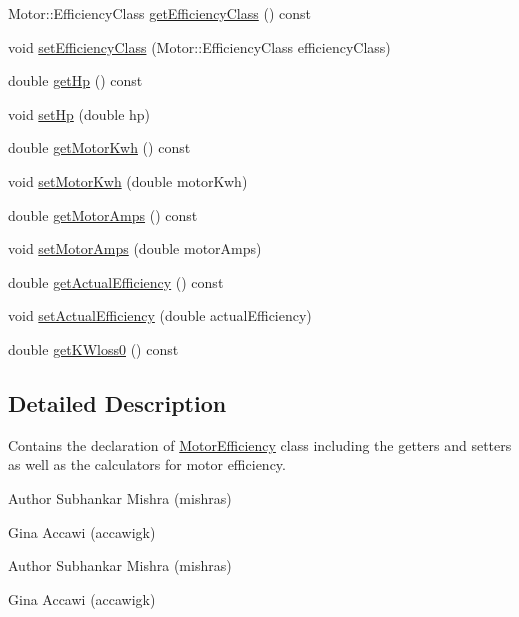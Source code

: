 \begin{DoxyCompactItemize}
\item 
Motor\+::\+Efficiency\+Class \hyperlink{class_motor_efficiency_a9eb7d5c2fc598f655c1a3d12790e4d17}{get\+Efficiency\+Class} () const
\item 
void \hyperlink{class_motor_efficiency_a1ff4790d01bf2e65bd7bce2edc98d0c5}{set\+Efficiency\+Class} (Motor\+::\+Efficiency\+Class efficiency\+Class)
\item 
double \hyperlink{class_motor_efficiency_a9f88159c82daa270975d7969debe88a9}{get\+Hp} () const
\item 
void \hyperlink{class_motor_efficiency_a4b86113447665413ddbae115199d9b3f}{set\+Hp} (double hp)
\item 
double \hyperlink{class_motor_efficiency_a4d21d0c44ee00f5d097b0acbcb73a8d8}{get\+Motor\+Kwh} () const
\item 
void \hyperlink{class_motor_efficiency_ab1c7507bac259565e43a6777d079148b}{set\+Motor\+Kwh} (double motor\+Kwh)
\item 
double \hyperlink{class_motor_efficiency_a955906509a4b49274b35c1b119c4a4b4}{get\+Motor\+Amps} () const
\item 
void \hyperlink{class_motor_efficiency_ac86aa8d6162e63eb440e07e557534c74}{set\+Motor\+Amps} (double motor\+Amps)
\item 
double \hyperlink{class_motor_efficiency_ae40031307b8631cf40df1c4069069dc0}{get\+Actual\+Efficiency} () const
\item 
void \hyperlink{class_motor_efficiency_a7a5ad8d01fdc0a3bf93d952752487496}{set\+Actual\+Efficiency} (double actual\+Efficiency)
\item 
double \hyperlink{class_motor_efficiency_a47398ac8203f5b79a0ca435673a4bc16}{get\+K\+Wloss0} () const
\end{DoxyCompactItemize}


\subsection{Detailed Description}
Contains the declaration of \hyperlink{class_motor_efficiency}{Motor\+Efficiency} class including the getters and setters as well as the calculators for motor efficiency. 

\begin{DoxyAuthor}{Author}
Subhankar Mishra (mishras) 

Gina Accawi (accawigk) 
\end{DoxyAuthor}


\begin{DoxyAuthor}{Author}
Subhankar Mishra (mishras) 

Gina Accawi (accawigk) 
\end{DoxyAuthor}



